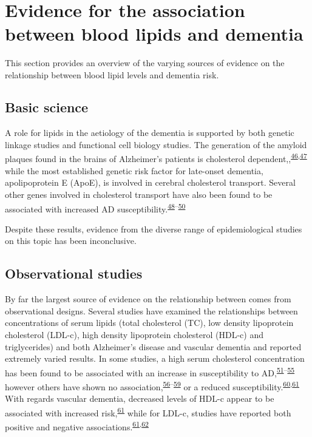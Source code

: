 \documentclass[a4paper, twoside]{templates/ociamthesis}
\begin{document}
~

\hypertarget{evidence-association}{%
\section{Evidence for the association between blood lipids and dementia}\label{evidence-association}}

This section provides an overview of the varying sources of evidence on the relationship between blood lipid levels and dementia risk.

\hypertarget{intro-basic-science}{%
\subsection{Basic science}\label{intro-basic-science}}

A role for lipids in the aetiology of the dementia is supported by both genetic linkage studies and functional cell biology studies. The generation of the amyloid plaques found in the brains of Alzheimer's patients is cholesterol dependent,,\textsuperscript{\protect\hyperlink{ref-burns2003}{46},\protect\hyperlink{ref-mizuno1999}{47}} while the most established genetic risk factor for late-onset dementia, apolipoprotein E (ApoE), is involved in cerebral cholesterol transport. Several other genes involved in cholesterol transport have also been found to be associated with increased AD susceptibility.\textsuperscript{\protect\hyperlink{ref-beecham2014}{48}--\protect\hyperlink{ref-meng2007}{50}}

Despite these results, evidence from the diverse range of epidemiological studies on this topic has been inconclusive.

\hypertarget{observational-studies}{%
\subsection{Observational studies}\label{observational-studies}}

By far the largest source of evidence on the relationship between comes from observational designs. Several studies have examined the relationships between concentrations of serum lipids (total cholesterol (TC), low density lipoprotein cholesterol (LDL-c), high density lipoprotein cholesterol (HDL-c) and triglycerides) and both Alzheimer's disease and vascular dementia and reported extremely varied results. In some studies, a high serum cholesterol concentration has been found to be associated with an increase in susceptibility to AD,\textsuperscript{\protect\hyperlink{ref-kivipelto2002}{51}--\protect\hyperlink{ref-whitmer2005}{55}} however others have shown no association,\textsuperscript{\protect\hyperlink{ref-li2005}{56}--\protect\hyperlink{ref-tan2003}{59}} or a reduced susceptibility.\textsuperscript{\protect\hyperlink{ref-mielke2005}{60},\protect\hyperlink{ref-reitz2004}{61}} With regards vascular dementia, decreased levels of HDL-c appear to be associated with increased risk,\textsuperscript{\protect\hyperlink{ref-reitz2004}{61}} while for LDL-c, studies have reported both positive and negative associations.\textsuperscript{\protect\hyperlink{ref-reitz2004}{61},\protect\hyperlink{ref-moroney1999}{62}}
\end{document}

